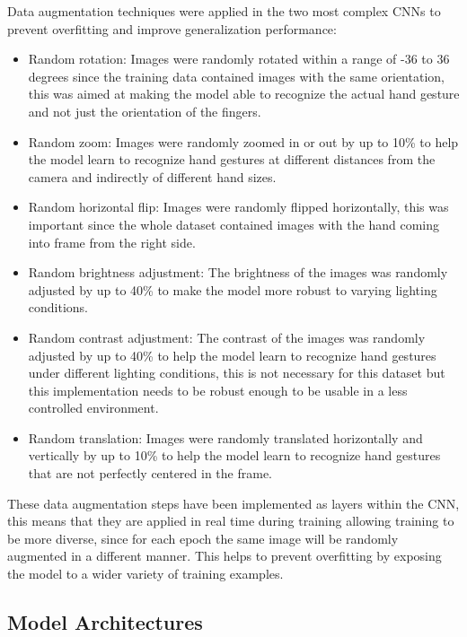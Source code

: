 \documentclass[runningheads]{llncs}
\begin{document}
Data augmentation techniques were applied in the two most complex CNNs to prevent overfitting and improve generalization performance:
\begin{itemize}
    \item Random rotation: Images were randomly rotated within a range of -36 to 36 degrees since the training data contained images with the same orientation, this was aimed at making the model able to recognize the actual hand gesture and not just the orientation of the fingers.
    \item Random zoom: Images were randomly zoomed in or out by up to 10\% to help the model learn to recognize hand gestures at different distances from the camera and indirectly of different hand sizes.
    \item Random horizontal flip: Images were randomly flipped horizontally, this was important since the whole dataset contained images with the hand coming into frame from the right side.
    \item Random brightness adjustment: The brightness of the images was randomly adjusted by up to 40\% to make the model more robust to varying lighting conditions.
    \item Random contrast adjustment: The contrast of the images was randomly adjusted by up to 40\% to help the model learn to recognize hand gestures under different lighting conditions, this is not necessary for this dataset but this implementation needs to be robust enough to be usable in a less controlled environment.
    \item Random translation: Images were randomly translated horizontally and vertically by up to 10\% to help the model learn to recognize hand gestures that are not perfectly centered in the frame.
\end{itemize}

These data augmentation steps have been implemented as layers within the CNN, this means that they are applied in real time during training allowing training to be more diverse, since for each epoch the same image will be randomly augmented in a different manner. This helps to prevent overfitting by exposing the model to a wider variety of training examples.




\subsection{Model Architectures}
\end{document}
